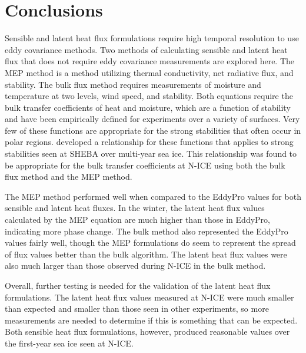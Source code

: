 \section{Conclusions}
Sensible and latent heat flux formulations require high temporal resolution to use eddy covariance methods. Two methods of calculating sensible and latent heat flux that does not require eddy covariance measurements are explored here. The MEP method is a method utilizing thermal conductivity, net radiative flux, and  stability. The bulk flux method requires measurements of moisture and temperature at two levels, wind speed, and stability. Both equations require the bulk transfer coefficients of heat and moisture, which are a function of stability and have been empirically defined for experiments over a variety of surfaces. Very few of these functions are appropriate for the strong stabilities that often occur in polar regions. \citet{andreas:311} developed a relationship for these functions that applies to strong stabilities seen at SHEBA over multi-year sea ice. This relationship was found to be appropriate for the bulk transfer coefficients at N-ICE using both the bulk flux method and the MEP method. 

The MEP method performed well when compared to the EddyPro values for both sensible and latent heat fluxes. In the winter, the latent heat flux values calculated by the MEP equation are much higher than those in EddyPro, indicating  more phase change. The bulk method also represented the EddyPro values fairly well, though the MEP formulations do seem to represent the spread of flux values better than the bulk algorithm. The latent heat flux values were also much larger than those observed during N-ICE in the bulk method. 

Overall, further testing is needed for the validation of the latent heat flux formulations. The latent heat flux values measured at N-ICE were much smaller than expected and smaller than those seen in other experiments, so more measurements are needed to determine if this is something that can be expected. Both sensible heat flux formulations, however, produced reasonable values over the first-year sea ice seen at N-ICE. 









